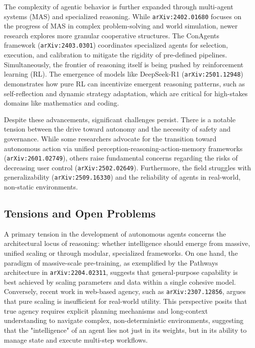 \documentclass[11pt]{article}
\begin{document}
The complexity of agentic behavior is further expanded through multi-agent systems (MAS) and specialized reasoning. While \texttt{arXiv:2402.01680} focuses on the progress of MAS in complex problem-solving and world simulation, newer research explores more granular cooperative structures. The ConAgents framework (\texttt{arXiv:2403.0301}) coordinates specialized agents for selection, execution, and calibration to mitigate the rigidity of pre-defined pipelines. Simultaneously, the frontier of reasoning itself is being pushed by reinforcement learning (RL). The emergence of models like DeepSeek-R1 (\texttt{arXiv:2501.12948}) demonstrates how pure RL can incentivize emergent reasoning patterns, such as self-reflection and dynamic strategy adaptation, which are critical for high-stakes domains like mathematics and coding.

Despite these advancements, significant challenges persist. There is a notable tension between the drive toward autonomy and the necessity of safety and governance. While some researchers advocate for the transition toward autonomous action via unified perception-reasoning-action-memory frameworks (\texttt{arXiv:2601.02749}), others raise fundamental concerns regarding the risks of decreasing user control (\texttt{arXiv:2502.02649}). Furthermore, the field struggles with generalizability (\texttt{arXiv:2509.16330}) and the reliability of agents in real-world, non-static environments.

\subsection{Tensions and Open Problems}

A primary tension in the development of autonomous agents concerns the architectural locus of reasoning: whether intelligence should emerge from massive, unified scaling or through modular, specialized frameworks. On one hand, the paradigm of massive-scale pre-training, as exemplified by the Pathways architecture in \texttt{arXiv:2204.02311}, suggests that general-purpose capability is best achieved by scaling parameters and data within a single cohesive model. Conversely, recent work in web-based agency, such as \texttt{arXiv:2307.12856}, argues that pure scaling is insufficient for real-world utility. This perspective posits that true agency requires explicit planning mechanisms and long-context understanding to navigate complex, non-deterministic environments, suggesting that the "intelligence" of an agent lies not just in its weights, but in its ability to manage state and execute multi-step workflows.
\end{document}
